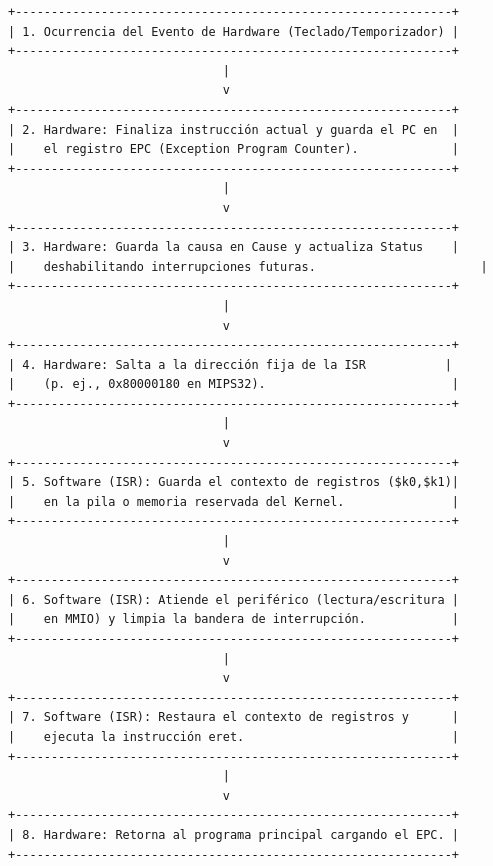 \documentclass[12pt,letterpaper]{article}
\begin{document}
\begin{enumerate}
    \begin{center}
    \small
    \begin{verbatim}
+-------------------------------------------------------------+
| 1. Ocurrencia del Evento de Hardware (Teclado/Temporizador) |
+-------------------------------------------------------------+
                              |
                              v
+-------------------------------------------------------------+
| 2. Hardware: Finaliza instrucción actual y guarda el PC en  |
|    el registro EPC (Exception Program Counter).             |
+-------------------------------------------------------------+
                              |
                              v
+-------------------------------------------------------------+
| 3. Hardware: Guarda la causa en Cause y actualiza Status    |
|    deshabilitando interrupciones futuras.                       |
+-------------------------------------------------------------+
                              |
                              v
+-------------------------------------------------------------+
| 4. Hardware: Salta a la dirección fija de la ISR           |
|    (p. ej., 0x80000180 en MIPS32).                          |
+-------------------------------------------------------------+
                              |
                              v
+-------------------------------------------------------------+
| 5. Software (ISR): Guarda el contexto de registros ($k0,$k1)|
|    en la pila o memoria reservada del Kernel.               |
+-------------------------------------------------------------+
                              |
                              v
+-------------------------------------------------------------+
| 6. Software (ISR): Atiende el periférico (lectura/escritura |
|    en MMIO) y limpia la bandera de interrupción.            |
+-------------------------------------------------------------+
                              |
                              v
+-------------------------------------------------------------+
| 7. Software (ISR): Restaura el contexto de registros y      |
|    ejecuta la instrucción eret.                             |
+-------------------------------------------------------------+
                              |
                              v
+-------------------------------------------------------------+
| 8. Hardware: Retorna al programa principal cargando el EPC. |
+-------------------------------------------------------------+
    \end{verbatim}
    \end{center}


\end{enumerate}
\end{document}
